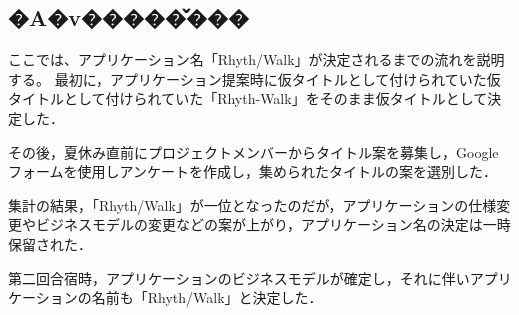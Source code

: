 \subsection{�A�v�����̌���}
ここでは、アプリケーション名「Rhyth/Walk」が決定されるまでの流れを説明する。
最初に，アプリケーション提案時に仮タイトルとして付けられていた仮タイトルとして付けられていた「Rhyth-Walk」をそのまま仮タイトルとして決定した．\par
その後，夏休み直前にプロジェクトメンバーからタイトル案を募集し，Googleフォームを使用しアンケートを作成し，集められたタイトルの案を選別した．\par
集計の結果，「Rhyth/Walk」が一位となったのだが，アプリケーションの仕様変更やビジネスモデルの変更などの案が上がり，アプリケーション名の決定は一時保留された．\par
第二回合宿時，アプリケーションのビジネスモデルが確定し，それに伴いアプリケーションの名前も「Rhyth/Walk」と決定した．\par
